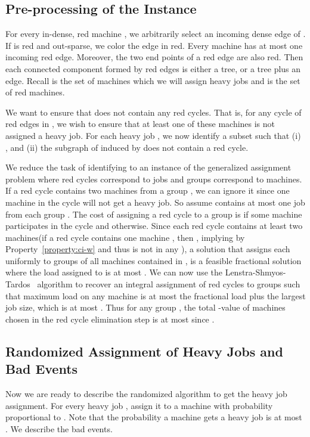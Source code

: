 \documentclass[11pt]{article}
\newcounter{prop}
\begin{document}
\subsection{Pre-processing of the Instance}\label{sec:preprocessing}
For every in-dense, red machine , we arbitrarily select an incoming dense edge  of .  If  is red and out-sparse, we color the edge  in  red. Every machine has at most one incoming red edge. Moreover, the two end points of a red edge are also red. Then each connected component formed by red edges is either a tree, or a tree plus an edge. Recall  is the set of machines which we will assign heavy jobs and  is the set of red machines.

We want to  ensure that  does not contain any red cycles. That is, for any cycle of red edges in , we wish to ensure that at least one of these machines is not assigned a heavy job.  For each heavy job , we now identify a subset  such that (i) , and (ii) the subgraph of  induced by  does not contain a red cycle. 

We reduce the task of identifying  to an instance of the generalized assignment problem where red cycles correspond to jobs and groups correspond to machines. If a red cycle  contains two machines from a group , we can ignore it since one machine in the cycle will not get a heavy job. So assume  contains at most one job from each group . The cost of assigning a red cycle  to a group  is  if some machine  participates in the cycle  and  otherwise. Since each red cycle  contains at least two machines(if a red cycle contains one machine , then , implying  by Property~\ref{property:ci-w} and thus  is not in any ), a solution that assigns each  uniformly to groups of all machines contained in , is a feasible fractional solution where the load assigned to  is at most . We can now use the Lenstra-Shmyos-Tardos~\cite{LST90} algorithm to recover an integral assignment of red cycles to groups such that maximum load on any machine is at most the fractional load  plus the largest job size, which is at most .  Thus for any group , the total -value of machines chosen in the red cycle elimination step is at most  since .

\subsection{Randomized Assignment of Heavy Jobs and Bad Events}
Now we are ready to describe the randomized algorithm to get the heavy job assignment. For every heavy job , assign it to a machine  with probability proportional to . Note that the probability  a machine  gets a heavy job is at most . We describe the bad events.
\end{document}
